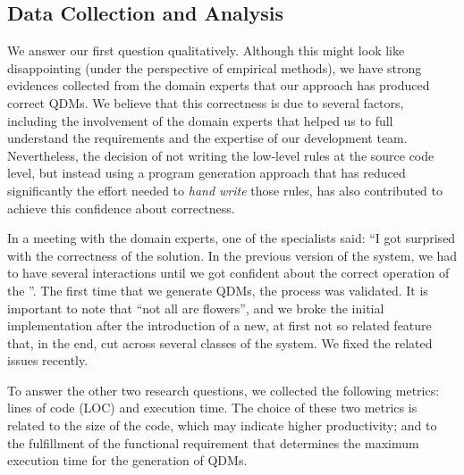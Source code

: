

\subsection{Data Collection and Analysis}

We answer our first question qualitatively. Although this might look like disappointing (under the 
perspective of empirical methods), we have strong evidences collected from the domain experts 
that our approach has produced correct QDMs. We believe that this correctness is due to several 
factors, including the involvement of the domain experts that helped us to full understand 
the requirements and the expertise of our development team. Nevertheless, the decision of 
not writing the low-level rules at the source code level, but instead using a program 
generation approach that has reduced significantly the effort needed to \emph{hand write} 
those rules, has also contributed to achieve this confidence about correctness. 

In a meeting 
with the domain experts, one of the specialists said: ``I got surprised with the 
correctness of the solution. In the previous version of the system, we had to have several 
interactions until we got confident about the correct operation of the \callers''. The first 
time that we generate QDMs, the process was validated. It is important to note that ``not all 
are flowers'', and we broke the initial implementation after the introduction of a new, 
at first not so related feature that, in the end, cut across several classes of 
the system. We fixed the related issues recently.  

To answer the other two research questions, we collected the following metrics: lines of code (LOC) and execution time. The choice of these 
two metrics is related to the size of the code, which may indicate higher productivity; and to the fulfillment of the 
functional requirement that determines the maximum execution time for the generation of QDMs.

